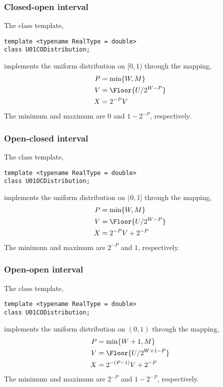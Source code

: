 \subsubsection{Closed-open interval}

The class template,
\begin{Verbatim}
template <typename RealType = double>
class U01CODistribution;
\end{Verbatim}
implements the uniform distribution on $[0, 1)$ through the mapping,
\begin{align*}
  P &= \min\{W, M\} \\
  V &= \Floor{U / 2^{W - P}} \\
  X &= 2^{-P} V
\end{align*}
The minimum and maximum are $0$ and $1 - 2^{-P}$, respectively.

\subsubsection{Open-closed interval}

The class template,
\begin{Verbatim}
template <typename RealType = double>
class U01OCDistribution;
\end{Verbatim}
implements the uniform distribution on $(0, 1]$ through the mapping,
\begin{align*}
  P &= \min\{W, M\} \\
  V &= \Floor{U / 2^{W - P}} \\
  X &= 2^{-P} V + 2^{-P}
\end{align*}
The minimum and maximum are $2^{-P}$ and $1$, respectively.

\subsubsection{Open-open interval}

The class template,
\begin{Verbatim}
template <typename RealType = double>
class U01CODistribution;
\end{Verbatim}
implements the uniform distribution on $(0, 1)$ through the mapping,
\begin{align*}
  P &= \min\{W + 1, M\} \\
  V &= \Floor{U / 2^{W + 1 - P}} \\
  X &= 2^{-(P - 1)} V + 2^{-P}
\end{align*}
The minimum and maximum are $2^{-P}$ and $1 - 2^{-P}$, respectively.


